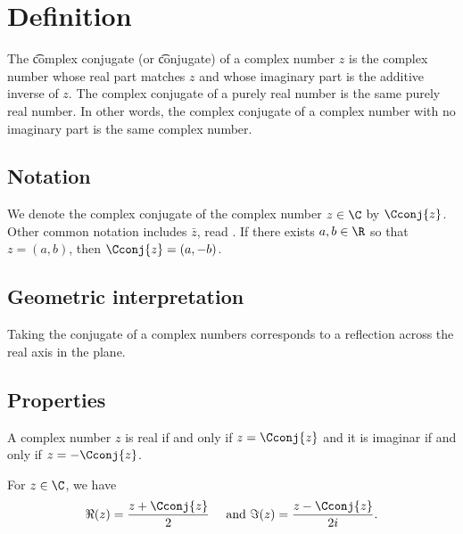 

\section*{Definition}

The \t{complex conjugate} (or \t{conjugate}) of a complex number $z$ is the complex number whose real part matches $z$ and whose imaginary part is the additive inverse of $z$.
The complex conjugate of a purely real number is the same purely real number.
In other words, the complex conjugate of a complex number with no imaginary part is the same complex number.

\subsection*{Notation}

We denote the complex conjugate of the complex number $z \in \C $ by $\Cconj{z}$.
Other common notation includes $\bar{z}$, read .
If there exists $a, b \in \R $ so that $z = (a, b)$, then $\Cconj{z} = (a, -b)$.

\subsection*{Geometric interpretation}

Taking the conjugate of a complex numbers corresponds to a reflection across the real axis in the plane.

\subsection*{Properties}

A complex number $z$ is real if and only if $z = \Cconj{z}$ and it is imaginar if and only if $z = -\Cconj{z}$.

\begin{proposition}
For $z \in \C $, we have
  \[
\Re (z) = \frac{z + \Cconj{z}}{2} \quad \text{ and } \Im (z) = \frac{z - \Cconj{z}}{2i}.
  \]\end{proposition}
\blankpage